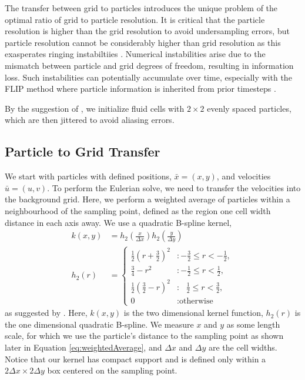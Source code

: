 \documentclass[sigconf]{acmart}
\begin{document}
The transfer between grid to particles introduces the unique problem of the optimal ratio of grid to particle resolution. It is critical that the particle resolution is higher than the grid resolution to avoid undersampling errors, but particle resolution cannot be considerably higher than grid resolution as this exasperates ringing instabiltiies \cite{zhu2005, jiang2015}. Numerical instabilities arise due to the mismatch between particle and grid degrees of freedom, resulting in information loss. Such instabilities can potentially accumulate over time, especially with the FLIP method where particle information is inherited from prior timesteps \cite{jiang2015}.

By the suggestion of \cite{zhu2005}, we initialize fluid cells with $2\times{}2$ evenly spaced particles, which are then jittered to avoid aliasing errors.

\subsection{Particle to Grid Transfer}

We start with particles with defined positions, $\bar{x} = (x,y)$, and velocities $\bar{u} = (u,v)$. To perform the Eulerian solve, we need to transfer the velocities into the background grid. Here, we perform a weighted average of particles within a neighbourhood of the sampling point, defined as the region one cell width distance in each axis away. We use a quadratic B-spline kernel,
\begin{align}
  k(x,y) &= h_2\left(\frac{x}{\Delta{}x}\right)h_2\left(\frac{y}{\Delta{}y}\right) \\
  h_2(r) &=
    \begin{cases}
    \frac{1}{2}(r+\frac{3}{2})^2 &: -\frac{3}{2} \leq{} r < -\frac{1}{2},\\
    \frac{3}{4}-r^2 &: -\frac{1}{2} \leq{} r < \frac{1}{2}, \\
    \frac{1}{2}(\frac{3}{2}-r)^2 &:\ \ \ \frac{1}{2} \leq{} r < \frac{3}{2}, \\
    0 &: \text{otherwise}
    \end{cases}
\end{align}
as suggested by \cite{bridson2015}. Here, $k(x,y)$ is the two dimensional kernel function, $h_2(r)$ is the one dimensional quadratic B-spline. We measure $x$ and $y$ as some length scale, for which we use the particle's distance to the sampling point as shown later in Equation \ref{eq:weightedAverage}, and $\Delta{}x$ and $\Delta{}y$ are the cell widths. Notice that our kernel has compact support and is defined only within a $2\Delta{}x\times{}2\Delta{}y$ box centered on the sampling point.
\end{document}
